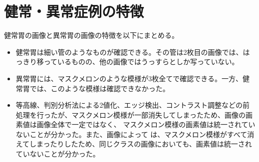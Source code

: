 \section{健常・異常症例の特徴}
健常胃の画像と異常胃の画像の特徴を以下にまとめる。
\begin{itemize}
  \item 健常胃は細い管のようなものが確認できる。その管は2枚目の画像では、はっきり移っているものの、他の画像ではうっすらとしか写っていない。
  \item 異常胃には、マスクメロンのような模様が3枚全てで確認できる。一方、健常胃では、このような模様は確認できなかった。
  \item 等高線、判別分析法による2値化、エッジ検出、コントラスト調整などの前処理を行ったが、マスクメロン模様が一部消失してしまったため、画像の画素値は画像全体で一定ではなく、
  マスクメロン模様の画素値は統一されていないことが分かった。また、画像によって
  は、マスクメロン模様がすべて消えてしまったりしたため、同じクラスの画像においても、画素値は統一されていないことが分かった。
\end{itemize}